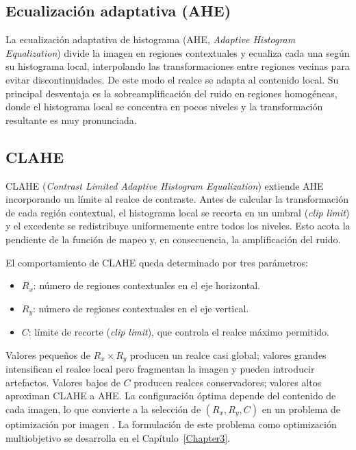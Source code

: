 \subsection{Ecualización adaptativa (AHE)}

La ecualización adaptativa de histograma (AHE, \textit{Adaptive Histogram Equalization}) \citep{Pizer1987} divide la imagen en regiones contextuales y ecualiza cada una según su histograma local, interpolando las transformaciones entre regiones vecinas para evitar discontinuidades. De este modo el realce se adapta al contenido local. Su principal desventaja es la sobreamplificación del ruido en regiones homogéneas, donde el histograma local se concentra en pocos niveles y la transformación resultante es muy pronunciada.

\subsection{CLAHE}

CLAHE (\textit{Contrast Limited Adaptive Histogram Equalization}) \citep{Zuiderveld1994} extiende AHE incorporando un límite al realce de contraste. Antes de calcular la transformación de cada región contextual, el histograma local se recorta en un umbral (\textit{clip limit}) y el excedente se redistribuye uniformemente entre todos los niveles. Esto acota la pendiente de la función de mapeo y, en consecuencia, la amplificación del ruido.

El comportamiento de CLAHE queda determinado por tres parámetros:

\begin{itemize}
    \item $R_x$: número de regiones contextuales en el eje horizontal.
    \item $R_y$: número de regiones contextuales en el eje vertical.
    \item $C$: límite de recorte (\textit{clip limit}), que controla el realce máximo permitido.
\end{itemize}

Valores pequeños de $R_x \times R_y$ producen un realce casi global; valores grandes intensifican el realce local pero fragmentan la imagen y pueden introducir artefactos. Valores bajos de $C$ producen realces conservadores; valores altos aproximan CLAHE a AHE. La configuración óptima depende del contenido de cada imagen, lo que convierte a la selección de $(R_x, R_y, C)$ en un problema de optimización por imagen \citep{More2015}. La formulación de este problema como optimización multiobjetivo se desarrolla en el Capítulo~\ref{Chapter3}.

